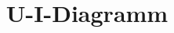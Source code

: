 \def\br{\hspace*{\fill} \\* }
\def\gt{>}
\def\lt{<}
\let\Oldtex\TeX
\let\Oldlatex\LaTeX
\renewcommand{\TeX}{\textrm{\Oldtex}}
\renewcommand{\LaTeX}{\textrm{\Oldlatex}}
\title{U-I-Diagramm}
    

    
    
    
    
    
\makeatletter
\def\PY@reset{\let\PY@it=\relax \let\PY@bf=\relax%
    \let\PY@ul=\relax \let\PY@tc=\relax%
    \let\PY@bc=\relax \let\PY@ff=\relax}
\def\PY@tok#1{\csname PY@tok@#1\endcsname}
\def\PY@toks#1+{\ifx\relax#1\empty\else%
    \PY@tok{#1}\expandafter\PY@toks\fi}
\def\PY@do#1{\PY@bc{\PY@tc{\PY@ul{%
    \PY@it{\PY@bf{\PY@ff{#1}}}}}}}
\def\PY#1#2{\PY@reset\PY@toks#1+\relax+\PY@do{#2}}

